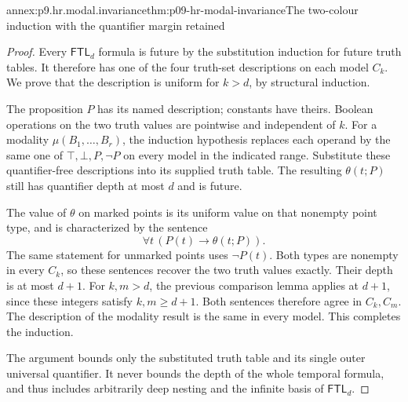 \begin{annexitem}{annex:p9.hr.modal.invariance}{thm:p09-hr-modal-invariance}{The two-colour induction with the quantifier margin retained}
\begin{proof}
Every \(\mathsf{FTL}_d\)
formula is future by
the substitution induction
for future truth tables.
It therefore has one
of the four truth-set
descriptions on each
model \(C_k\).
We prove that the
description is uniform
for \(k>d\), by
structural induction.

The proposition \(P\)
has its named
description; constants
have theirs. Boolean
operations on the
two truth values
are pointwise and
independent of \(k\).
For a modality
\(\mu(B_1,\ldots,B_r)\),
the induction hypothesis
replaces each operand
by the same one of
\(\top,\bot,P,\neg P\)
on every model in
the indicated range.
Substitute these
quantifier-free
descriptions into
its supplied
truth table.
The resulting
\(\theta(t;P)\)
still has quantifier
depth at most \(d\)
and is future.

The value of
\(\theta\) on
marked points
is its uniform
value on that
nonempty point type,
and is characterized
by the sentence
\[
                \forall t\,(P(t)\to\theta(t;P)).
\]
The same statement
for unmarked points
uses \(\neg P(t)\).
Both types are
nonempty in every
\(C_k\), so these
sentences recover
the two truth
values exactly.
Their depth is
at most \(d+1\).
For \(k,m>d\),
the previous
comparison lemma
applies at \(d+1\),
since these integers
satisfy \(k,m\geq d+1\).
Both sentences
therefore agree
in \(C_k,C_m\).
The description
of the modality
result is the
same in every
model. This
completes the
induction.

The argument bounds
only the substituted
truth table and
its single outer
universal quantifier.
It never bounds
the depth of the
whole temporal
formula, and thus
includes arbitrarily
deep nesting and
the infinite basis
of \(\mathsf{FTL}_d\).
\end{proof}
\end{annexitem}

